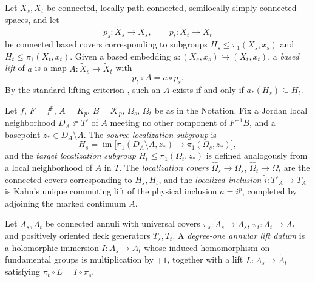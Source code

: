 \begin{definition}
\label{def:localized-lift-data}
Let \(X_s,X_t\) be connected, locally path-connected, semilocally simply
connected spaces, and let
\[
 p_s:\widetilde X_s\to X_s,\qquad p_t:\widetilde X_t\to X_t
\]
be connected based covers corresponding to subgroups
\(H_s\le\pi_1(X_s,x_s)\) and \(H_t\le\pi_1(X_t,x_t)\).  Given a based
embedding \(a:(X_s,x_s)\hookrightarrow(X_t,x_t)\), a \emph{based lift}
of \(a\) is a map \(A:\widetilde X_s\to\widetilde X_t\) with
\[
 p_t\circ A=a\circ p_s .
\]
By the standard lifting criterion \cite{Hatcher02}, such an \(A\)
exists if and only if
\(a_*(H_s)\subseteq H_t\).
\end{definition}

\begin{definition}
\label{def:canonical-localization-subgroups}
Let \(f\), \(F=f^p\), \(A=K_p\), \(B=\mathcal K_p\), \(\Omega_s\),
\(\Omega_t\) be as in the Notation.  Fix a Jordan local neighborhood
\(D_A\Subset T'\) of \(A\) meeting no other component of \(F^{-1}B\),
and a basepoint \(z_*\in D_A\setminus A\).  The \emph{source
localization subgroup} is
\[
 H_s=\operatorname{im}\bigl[\pi_1(D_A\setminus A,z_*)\longrightarrow
 \pi_1(\Omega_s,z_*)\bigr],
\]
and the \emph{target localization subgroup}
\(H_t\le\pi_1(\Omega_t,z_*)\) is defined analogously from a local
neighborhood of \(A\) in \(T\).  The \emph{localization covers}
\(\widehat\Omega_s\to\Omega_s\), \(\widehat\Omega_t\to\Omega_t\) are the
connected covers corresponding to \(H_s,H_t\), and the \emph{localized
inclusion} \(\widehat i:T'_A\to T_A\) is Kahn's unique commuting lift of
the physical inclusion \(a=i^p\), completed by adjoining the marked
continuum \(A\).
\end{definition}

\begin{definition}
\label{def:annular-lift-data}
Let \(A_s,A_t\) be connected annuli with universal covers
\(\pi_s:\widetilde A_s\to A_s\), \(\pi_t:\widetilde A_t\to A_t\) and
positively oriented deck generators \(T_s,T_t\).  A \emph{degree-one
annular lift datum} is a holomorphic immersion \(I:A_s\to A_t\) whose
induced homomorphism on fundamental groups is multiplication by \(+1\),
together with a lift \(L:\widetilde A_s\to\widetilde A_t\) satisfying
\(\pi_t\circ L=I\circ\pi_s\).
\end{definition}